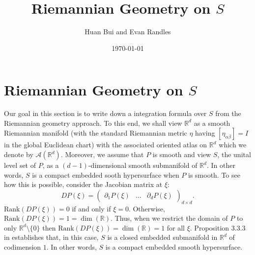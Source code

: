 \documentclass{article}
\author{Huan Bui and Evan Randles}
\title{Riemannian Geometry on $S$}
\date{\today}
\newcommand{\p}{\partial}
\newcommand{\R}{\mathbb{R}}
\theoremstyle{theorem}
\begin{document}
\maketitle

\section{Riemannian Geometry on $S$}

Our goal in this section is to write down a integration formula over $S$ from the Riemannian geometry approach. To this end, we shall view $\mathbb{R}^d$ as a smooth Riemannian manifold (with the standard Riemannian metric $\eta$ having $[\eta_{\alpha\beta}]=I$ in the global Euclidean chart) with the associated oriented atlas on $\mathbb{R}^d$ which we denote by $\mathcal{A}(\mathbb{R}^d)$. Moreover, we assume that $P$ is smooth and view $S$, the unital level set of $P$, as a $(d-1)$-dimensional smooth submanifold of $\R^d$. In other words, $S$ is a compact embedded sooth hypersurface when $P$ is smooth. To see how this is possible, consider the Jacobian matrix at $\xi$:
\begin{equation*}
    DP(\xi) = \begin{pmatrix}
    \p_1 P(\xi) & \dots & \p_{d} P(\xi)
    \end{pmatrix}_{ d \times d}.
\end{equation*}
$\text{Rank}(DP(\xi)) = 0$ if and only if $\xi = 0$. Otherwise, $\text{Rank}(DP(\xi)) = 1 = \dim(\R)$. Thus, when we restrict the domain of $P$ to only $\R^d \setminus \{ 0\}$ then $\text{Rank}(DP(\xi)) = \dim(\R) = 1$ for all $\xi$. Proposition 3.3.3 in \cite{absil2009optimization} establishes that, in this case, $S$ is a closed embedded submanifold in $\R^d$ of codimension $1$. In other words, $S$ is a compact embedded smooth hypersurface.
\end{document}
